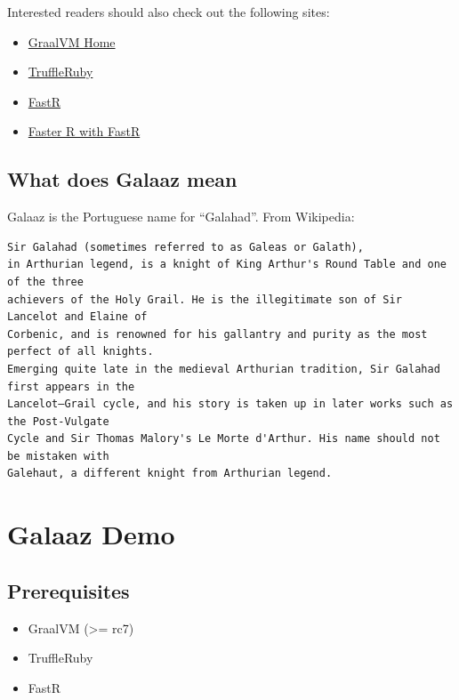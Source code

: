 \documentclass[]{article}
\providecommand{\tightlist}{%
  \setlength{\itemsep}{0pt}\setlength{\parskip}{0pt}}
\begin{document}
Interested readers should also check out the following sites:

\begin{itemize}
\tightlist
\item
  \href{https://www.graalvm.org/}{GraalVM Home}
\item
  \href{https://github.com/oracle/truffleruby}{TruffleRuby}
\item
  \href{https://github.com/oracle/fastr}{FastR}
\item
  \href{https://medium.com/graalvm/faster-r-with-fastr-4b8db0e0dceb}{Faster
  R with FastR}
\end{itemize}

\subsection{What does Galaaz mean}\label{what-does-galaaz-mean}

Galaaz is the Portuguese name for ``Galahad''. From Wikipedia:

\begin{verbatim}
Sir Galahad (sometimes referred to as Galeas or Galath),
in Arthurian legend, is a knight of King Arthur's Round Table and one of the three
achievers of the Holy Grail. He is the illegitimate son of Sir Lancelot and Elaine of
Corbenic, and is renowned for his gallantry and purity as the most perfect of all knights.
Emerging quite late in the medieval Arthurian tradition, Sir Galahad first appears in the
Lancelot–Grail cycle, and his story is taken up in later works such as the Post-Vulgate
Cycle and Sir Thomas Malory's Le Morte d'Arthur. His name should not be mistaken with
Galehaut, a different knight from Arthurian legend. 
\end{verbatim}

\section{Galaaz Demo}\label{galaaz-demo}

\subsection{Prerequisites}\label{prerequisites}

\begin{itemize}
\tightlist
\item
  GraalVM (\textgreater{}= rc7)
\item
  TruffleRuby
\item
  FastR
\end{itemize}
\end{document}
